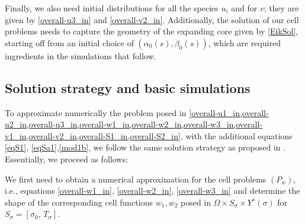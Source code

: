 \documentclass[reqno, 11pt]{amsart}
\numberwithin{equation}{section}
\newcommand{\ee}{{\mathrm{e}}}
\def\be{\begin{equation}}
\def\ee{\end{equation}}
\begin{document}
 
 Finally, we also need initial distributions for all the species $u_i$ and for $v$; they are given by \eqref{overall-u3_in} and \eqref{overall-v2_in}. Additionally,  the solution of our cell problems needs to capture the geometry of the expanding core given by \eqref{EikSol}, starting off from an initial choice of $(\alpha_0(s), \beta_0(s))$, which are required ingredients in the simulations that follow.

  
 

\subsection{Solution strategy and basic simulations}

To approximate numerically the problem posed in \cref{overall-u1_in,overall-u2_in,overall-u3_in,overall-w1_in,overall-w2_in,overall-w3_in,overall-v1_in,overall-v2_in,overall-S1_in,overall-S2_in}, with the additional equations \eqref{eqS1}, \eqref{eqSa1},\eqref{mod1b}, we follow the same solution strategy as proposed in \cite{EdenNikolopoulosMuntean22}. Essentially, we proceed as follows:

We first need to obtain a numerical approximation for the cell problems $(P_w)$, i.e., equations \eqref{overall-w1_in}, \eqref{overall-w2_in}, \eqref{overall-w3_in} and determine the shape of the corresponding cell functions $w_1,w_2$ posed in $\Omega\times S_{\sigma}\times  Y^s(\sigma)$ for $S_{\sigma}=[\sigma_0,\,T_\sigma]$. 
\end{document}
